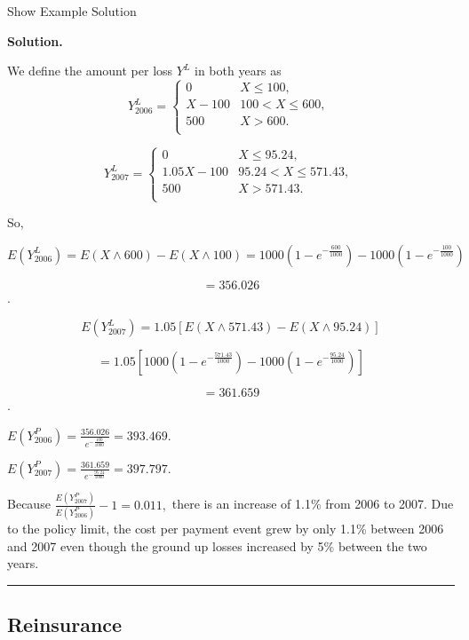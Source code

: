 \documentclass[]{book}
\theoremstyle{definition}
\theoremstyle{definition}
\theoremstyle{definition}
\theoremstyle{remark}
\begin{document}
Show Example Solution

\hypertarget{toggleExampleLoss.4.5}{}
\textbf{Solution.}

We define the amount per loss \(Y^L\) in both years as
\[Y_{2006}^{L} = \left\{ \begin{matrix}
0 & X \leq 100, \\
X - 100 & 100 <  X \leq 600, \\
500 & X > 600. \\
\end{matrix} \right.\ \]

\[Y_{2007}^{L} = \left\{ \begin{matrix}
0 & X \leq 95.24, \\
1.05X - 100 & 95.24 <  X \leq 571.43, \\
500 & X > 571.43. \\
\end{matrix} \right.\ \]

So,

\[E\left( Y_{2006}^{L} \right) = E\left( X \land 600 \right) - E\left( X \land 100 \right) = 1000\left( {1 - e}^{- \frac{600}{1000}} \right) - 1000\left( {1 - e}^{- \frac{100}{1000}} \right)\]

\[= 356.026\].

\[E\left( Y_{2007}^{L} \right) = 1.05\left\lbrack E\left( X \land 571.43 \right) - E\left( X \land 95.24 \right) \right\rbrack\]

\[= 1.05\left\lbrack 1000\left( {1 - e}^{- \frac{571.43}{1000}} \right) - 1000\left( {1 - e}^{- \frac{95.24}{1000}} \right) \right\rbrack\]

\[=361.659\].

\(E\left( Y_{2006}^{P} \right) = \frac{356.026}{e^{- \frac{100}{1000}}} = 393.469\).

\(E\left( Y_{2007}^{P} \right) = \frac{361.659}{e^{- \frac{95.24}{1000}}} = 397.797\).

Because
\(\frac{E\left( Y_{2007}^{P} \right)}{E\left( Y_{2006}^{P} \right)} -1 = 0.011,\)
there is an increase of 1.1\% from 2006 to 2007. Due to the policy
limit, the cost per payment event grew by only 1.1\% between 2006 and
2007 even though the ground up losses increased by 5\% between the two
years.

\begin{center}\rule{0.5\linewidth}{\linethickness}\end{center}

\subsection{Reinsurance}\label{S:Chap3Reinsurance}
\end{document}
